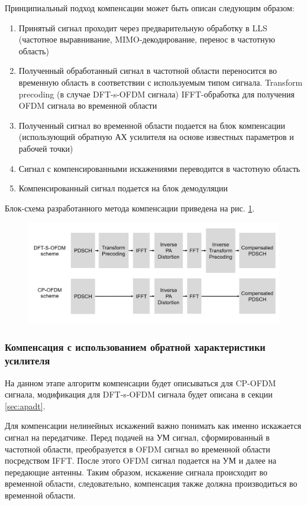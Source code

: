 Принципиальный подход компенсации может быть описан следующим
образом:
\begin{enumerate}
    \item Принятый сигнал проходит через предварительную обработку в LLS
    (частотное выравнивание, MIMO-декодирование, перенос в частотную
    область)
    \item Полученный обработанный сигнал в частотной области переносится во
    временную область в соответствии с используемым типом сигнала.
    \subitem Transform precoding (в случае DFT-s-OFDM сигнала)
    \subitem IFFT-обработка для получения OFDM сигнала во временной области
    \item Полученный сигнал во временной области подается на блок
    компенсации (использующий обратную АХ усилителя на основе известных
    параметров и рабочей точки)
    \item Сигнал с компенсированными искажениями переводится в частотную
    область
    \item Компенсированный сигнал подается на блок демодуляции
\end{enumerate}

Блок-схема разработанного метода компенсации приведена на рис.
\ref{fig:compensation_scheme}. 

\begin{figure}[h!]
    \centering
    \includegraphics[width=0.95\linewidth]{figs/compensation_scheme.png}
    \caption{}
    \label{fig:compensation_scheme}
\end{figure}


\subsubsection{Компенсация с использованием обратной характеристики усилителя}
На данном этапе алгоритм компенсации будет описываться для CP-OFDM сигнала,
модификация для DFT-s-OFDM сигнала будет описана в секции \ref{sec:apadt}.

Для компенсации нелинейных искажений важно понимать как именно искажается
сигнал на передатчике. Перед подачей на УМ сигнал, сформированный в
частотной области, преобразуется в OFDM сигнал во временной области
посредством IFFT. После этого OFDM сигнал подается на УМ и далее на
передающие антенны. Таким образом, искажение сигнала происходит во
временной области, следовательно, компенсация также должна производиться во
временной области. 

